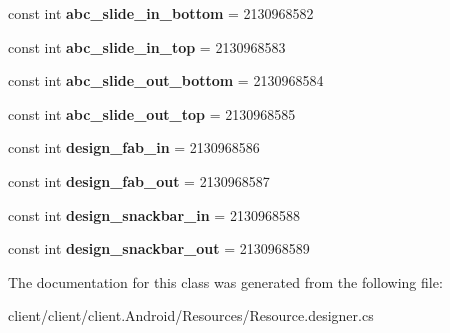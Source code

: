 \begin{DoxyCompactItemize}
\item 
\hypertarget{classClient_1_1Droid_1_1Resource_1_1Animation_a6f7a14d8da2f2f9c9452f9609cef95ad}{}const int {\bfseries abc\+\_\+slide\+\_\+in\+\_\+bottom} = 2130968582\label{classClient_1_1Droid_1_1Resource_1_1Animation_a6f7a14d8da2f2f9c9452f9609cef95ad}

\item 
\hypertarget{classClient_1_1Droid_1_1Resource_1_1Animation_a9c290b8880f11f0ffe250b2963383973}{}const int {\bfseries abc\+\_\+slide\+\_\+in\+\_\+top} = 2130968583\label{classClient_1_1Droid_1_1Resource_1_1Animation_a9c290b8880f11f0ffe250b2963383973}

\item 
\hypertarget{classClient_1_1Droid_1_1Resource_1_1Animation_a7dfa2d596d46f7d6e0c7669bf324bf2e}{}const int {\bfseries abc\+\_\+slide\+\_\+out\+\_\+bottom} = 2130968584\label{classClient_1_1Droid_1_1Resource_1_1Animation_a7dfa2d596d46f7d6e0c7669bf324bf2e}

\item 
\hypertarget{classClient_1_1Droid_1_1Resource_1_1Animation_a7d03a942efd020e8287905361b528c44}{}const int {\bfseries abc\+\_\+slide\+\_\+out\+\_\+top} = 2130968585\label{classClient_1_1Droid_1_1Resource_1_1Animation_a7d03a942efd020e8287905361b528c44}

\item 
\hypertarget{classClient_1_1Droid_1_1Resource_1_1Animation_afa45ca5ce9d1e5de0392055663219a04}{}const int {\bfseries design\+\_\+fab\+\_\+in} = 2130968586\label{classClient_1_1Droid_1_1Resource_1_1Animation_afa45ca5ce9d1e5de0392055663219a04}

\item 
\hypertarget{classClient_1_1Droid_1_1Resource_1_1Animation_a152b829aaf9e80edfc93f8fc9be1f524}{}const int {\bfseries design\+\_\+fab\+\_\+out} = 2130968587\label{classClient_1_1Droid_1_1Resource_1_1Animation_a152b829aaf9e80edfc93f8fc9be1f524}

\item 
\hypertarget{classClient_1_1Droid_1_1Resource_1_1Animation_a5b0053bbdbda6eda5cef0d4f1b941754}{}const int {\bfseries design\+\_\+snackbar\+\_\+in} = 2130968588\label{classClient_1_1Droid_1_1Resource_1_1Animation_a5b0053bbdbda6eda5cef0d4f1b941754}

\item 
\hypertarget{classClient_1_1Droid_1_1Resource_1_1Animation_a9945f0708affdfffb4f9768418050843}{}const int {\bfseries design\+\_\+snackbar\+\_\+out} = 2130968589\label{classClient_1_1Droid_1_1Resource_1_1Animation_a9945f0708affdfffb4f9768418050843}

\end{DoxyCompactItemize}


The documentation for this class was generated from the following file\+:\begin{DoxyCompactItemize}
\item 
client/client/client.\+Android/\+Resources/Resource.\+designer.\+cs\end{DoxyCompactItemize}
